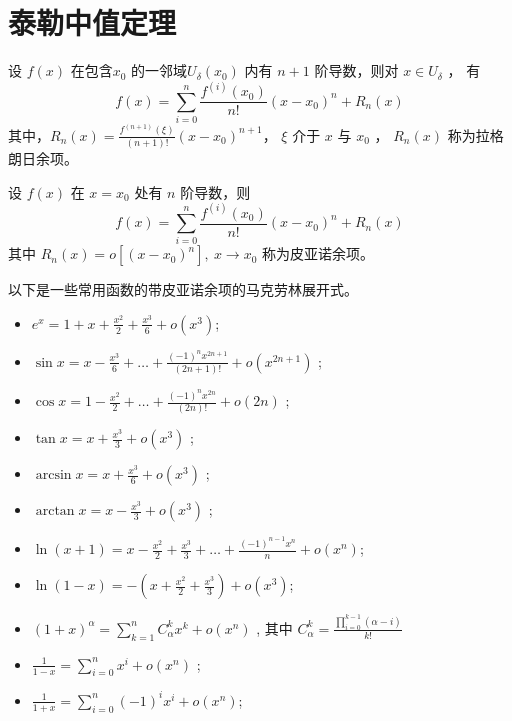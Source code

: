 \section{泰勒中值定理}

\begin{Theo}[带拉格朗日余项的泰勒中值定理]

    设 $ f(x) $ 在包含$ x_0 $ 的一邻域$ U_\delta(x_0) $ 内有 $ n+1 $ 阶导数，则对 $ x\in U_\delta $ ，
    有$$
        f(x) = \sum_{i=0}^n \frac{f^{(i)}(x_0)}{n!}(x-x_0)^n + R_n(x)
    $$ 
    其中，$ R_n(x)=\frac{f^{(n+1)}(\xi)}{(n+1)!}(x-x_0)^{n+1} $， $ \xi $ 介于 $ x $ 与 $ x_0 $ ，
    $ R_n(x) $ 称为拉格朗日余项。
\end{Theo}

\begin{Theo}[带皮亚诺余项的泰勒定理]

    设 $ f(x) $ 在 $ x=x_0 $ 处有 $ n $ 阶导数，则$$
        f(x) = \sum_{i=0}^n \frac{f^{(i)}(x_0)}{n!}(x-x_0)^n + R_n(x)
    $$ 其中 $ R_n(x)=o[(x-x_0)^n],\ x\rightarrow x_0 $ 称为皮亚诺余项。
\end{Theo}

以下是一些常用函数的带皮亚诺余项的马克劳林展开式。

\begin{itemize}
    \item $\displaystyle e^x = 1 + x + \frac{x^2}{2} + \frac{x^3}{6} + o(x^3)$;
    \item $\displaystyle \sin x = x - \frac{x^3}{6} + \dots + \frac{(-1)^{n}x^{2n+1}}{(2n+1)!} + o(x^{2n+1}) $ ;
    \item $\displaystyle \cos x = 1 - \frac{x^2}{2} + \dots + \frac{(-1)^{n}x^{2n}}{(2n)!} + o(2n)$ ;
    \item $\displaystyle \tan x = x + \frac{x^3}{3} + o(x^3)$ ;
    \item $\displaystyle \arcsin x = x + \frac{x^3}{6} +o(x^3)$ ;
    \item $\displaystyle \arctan x = x - \frac{x^3}{3} + o(x^3)$ ;
    \item $\displaystyle \ln (x+1) = x - \frac{x^2}{2} + \frac{x^3}{3} + \dots + \frac{(-1)^{n-1}x^n}{n} + o(x^n) $;
    \item $\displaystyle \ln(1-x) = -(x+\frac{x^2}{2} + \frac{x^3}{3}) + o(x^3)$;
    \item $\displaystyle (1+x)^\alpha = \sum_{k=1}^n C_\alpha^kx^k + o(x^n) $ ,
    其中 $\displaystyle C_\alpha^k=\frac{\prod_{i = 0}^{k-1}(\alpha - i)}{k!} $ 
    \item $\displaystyle \frac{1}{1-x} = \sum_{i=0}^n x^i + o(x^n) $ ;
    \item $\displaystyle \frac{1}{1+x} = \sum_{i=0}^n (-1)^i x^i + o(x^n) $;
\end{itemize}


